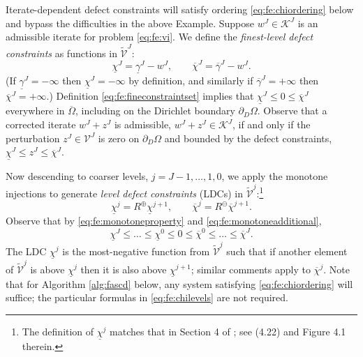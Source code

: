 \documentclass[review,hidelinks,onefignum,onetabnum]{siamart220329}
\newcommand{\cK}{\mathcal{K}}
\newcommand{\maxR}{R^{\bm{\oplus}}}
\newcommand{\minR}{R^{\bm{\ominus}}}
\begin{document}
Iterate-dependent defect constraints will satisfy ordering \eqref{eq:fe:chiordering} below and bypass the difficulties in the above Example.  Suppose $w^J \in \cK^J$ is an admissible iterate for problem \eqref{eq:fe:vi}.  We define the \emph{finest-level defect constraints} \cite{GraeserKornhuber2009} as functions in $\tilde{\mathcal{V}}^J$:
\begin{equation}
\underline{\chi}^J = \underline{\gamma}^J - w^J, \qquad \overline{\chi}^J = \overline{\gamma}^J - w^J. \label{eq:fe:defectconstraints}
\end{equation}
(If $\underline{\gamma}^J=-\infty$ then $\underline{\chi}^J=-\infty$ by definition, and similarly if $\overline{\gamma}^J=+\infty$ then $\overline{\chi}^J=+\infty$.)  Definition \eqref{eq:fe:fineconstraintset} implies that $\underline{\chi}^J \le 0 \le \overline{\chi}^J$ everywhere in $\overline{\Omega}$, including on the Dirichlet boundary $\partial_D\Omega$.    Observe that a corrected iterate $w^J + z^J$ is admissible, $w^J + z^J \in \cK^J$, if and only if the perturbation $z^J \in \mathcal{V}^J$ is zero on $\partial_D\Omega$ and bounded by the defect constraints, $\underline{\chi}^J \le z^J \le \overline{\chi}^J$.

Now descending to coarser levels, $j=J-1,\dots,1,0$, we apply the monotone injections to generate \emph{level defect constraints} (LDCs) in $\tilde{\mathcal{V}}^j$:\footnote{The definition of $\underline{\chi}^j$ matches that in Section 4 of \cite{GraeserKornhuber2009}; see (4.22) and Figure 4.1 therein.}
\begin{equation}
\underline{\chi}^{j} = \maxR \underline{\chi}^{j+1}, \qquad \overline{\chi}^{j} = \minR \overline{\chi}^{j+1}. \label{eq:fe:chilevels}
\end{equation}
Observe that by \eqref{eq:fe:monotoneproperty} and \eqref{eq:fe:monotoneadditional},
\begin{equation}
\underline{\chi}^{J} \le \dots \le \underline{\chi}^0 \le 0 \le \overline{\chi}^0 \le \dots \le \overline{\chi}^J. \label{eq:fe:chiordering}
\end{equation}
The LDC $\underline{\chi}^j$ is the most-negative function from $\tilde{\mathcal{V}}^j$ such that if another element of $\tilde{\mathcal{V}}^j$ is above $\underline{\chi}^j$ then it is also above $\underline{\chi}^{j+1}$; similar comments apply to $\overline{\chi}^{j}$.  Note that for Algorithm \ref{alg:fascd} below, any system satisfying \eqref{eq:fe:chiordering} will suffice; the particular formulas in \eqref{eq:fe:chilevels} are not required.
\end{document}

